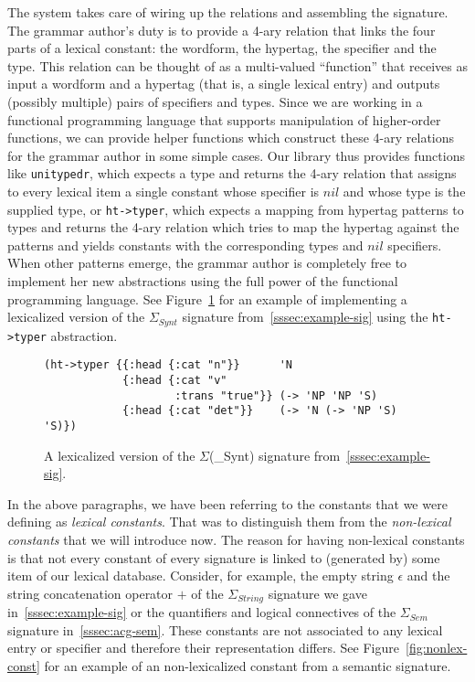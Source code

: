 The system takes care of wiring up the relations and assembling the
signature. The grammar author's duty is to provide a 4-ary relation that
links the four parts of a lexical constant: the wordform, the hypertag,
the specifier and the type. This relation can be thought of as a
multi-valued ``function'' that receives as input a wordform and a
hypertag (that is, a single lexical entry) and outputs (possibly
multiple) pairs of specifiers and types. Since we are working in a
functional programming language that supports manipulation of
higher-order functions, we can provide helper functions which construct
these 4-ary relations for the grammar author in some simple cases. Our
library thus provides functions like \texttt{unitypedr}, which expects a
type and returns the 4-ary relation that assigns to every lexical item a
single constant whose specifier is $nil$ and whose type is the supplied
type, or \texttt{ht->typer}, which expects a mapping from hypertag
patterns to types and returns the 4-ary relation which tries to map the
hypertag against the patterns and yields constants with the
corresponding types and $nil$ specifiers. When other patterns emerge,
the grammar author is completely free to implement her new abstractions
using the full power of the functional programming language. See
Figure~\ref{fig:lex-sig-impl} for an example of implementing a
lexicalized version of the $\Sigma_{Synt}$ signature
from~\ref{sssec:example-sig} using the \texttt{ht->typer} abstraction.

\begin{figure}
  \centering
\begin{verbatim}
(ht->typer {{:head {:cat "n"}}      'N
            {:head {:cat "v"
                    :trans "true"}} (-> 'NP 'NP 'S)
            {:head {:cat "det"}}    (-> 'N (-> 'NP 'S) 'S)})
\end{verbatim}
  \caption{\label{fig:lex-sig-impl} A lexicalized version of the
    $\Sigma$(\_{Synt}) signature from~\ref{sssec:example-sig}.}
\end{figure}

In the above paragraphs, we have been referring to the constants that we
were defining as \emph{lexical constants}. That was to distinguish them
from the \emph{non-lexical constants} that we will introduce now. The
reason for having non-lexical constants is that not every constant of
every signature is linked to (generated by) some item of our lexical
database. Consider, for example, the empty string $\epsilon$ and the
string concatenation operator $+$ of the $\Sigma_{String}$ signature we
gave in~\ref{sssec:example-sig} or the quantifiers and logical
connectives of the $\Sigma_{Sem}$ signature in~\ref{sssec:acg-sem}.
These constants are not associated to any lexical entry or specifier and
therefore their representation differs. See
Figure~\ref{fig:nonlex-const} for an example of an non-lexicalized
constant from a semantic signature.

